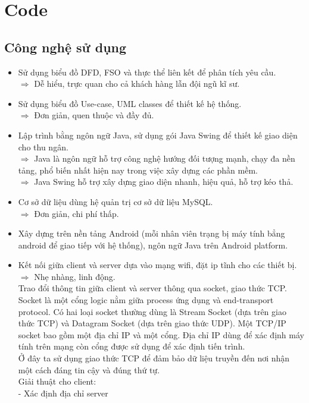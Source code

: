 \documentclass[a4paper,12pt]{report}
\begin{document}
\chapter{Code}
\section{Công nghệ sử dụng}
\begin{itemize}
	\item Sử dụng biểu đồ DFD, FSO và thực thể liên kết để phân tích yêu cầu.
	\\$\Rightarrow$ Dễ hiểu, trực quan cho cả khách hàng lẫn đội ngũ kĩ sư.
	\item Sử dụng biểu đồ Use-case, UML classes để thiết kế hệ thống.
	\\$\Rightarrow$ Đơn giản, quen thuộc và đầy đủ.
	\item Lập trình bằng ngôn ngữ Java, sử dụng gói Java Swing để thiết kế giao diện cho thu ngân.
	\\$\Rightarrow$ Java là ngôn ngữ hỗ trợ công nghệ hướng đối tượng mạnh, chạy đa nền tảng, phổ biến nhất hiện nay trong việc xây dựng các phần mềm.
	\\$\Rightarrow$ Java Swing hỗ trợ xây dựng giao diện nhanh, hiệu quả, hỗ trợ kéo thả.
	\item Cơ sở dữ liệu dùng hệ quản trị cơ sở dữ liệu MySQL.
	\\$\Rightarrow$ Đơn giản, chi phí thấp.
	\item Xây dựng trên nền tảng Android (mỗi nhân viên trạng bị máy tính bẳng android để giao tiếp với hệ thống), ngôn ngữ Java trên Android platform.
	\item Kết nối giữa client và server dựa vào mạng wifi, đặt ip tĩnh cho các thiết bị.
	\\$\Rightarrow$ Nhẹ nhàng, linh động.
	\\ Trao đổi thông tin giữa client và server thông qua socket, giao thức TCP.
	\\ Socket là một cổng logic nằm giữa process ứng dụng và end-transport protocol. Có hai loại socket thường dùng là Stream Socket (dựa trên giao thức TCP) và Datagram Socket (dựa trên giao thức UDP). Một TCP/IP socket bao gồm một địa chỉ IP và một cổng. Địa chỉ IP dùng để xác định máy tính trên mạng còn cổng được sử dụng để xác định tiến trình.
	\\ Ở đây ta sử dụng giao thức TCP để đảm bảo dữ liệu truyền đến nơi nhận một cách đáng tin cậy và đúng thứ tự.
	\\ Giải thuật cho client:
	\\ \hspace*{3mm} - Xác định địa chỉ server

\end{itemize}
\end{document}
